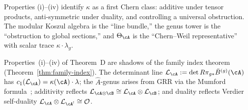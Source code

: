 \begin{remark}
\label{rem:kappa-first-chern}
Properties (i)--(iv) identify $\kappa$ as a first Chern class: additive under tensor products, anti-symmetric under duality, and controlling a universal obstruction.  The modular Koszul algebra is the ``line bundle,'' the genus tower is the ``obstruction to global sections,'' and $\Theta_{\cA}$ is the ``Chern--Weil representative'' with scalar trace $\kappa \cdot \lambda_g$.
\end{remark}

\begin{remark}\label{rem:homotopy-native-d}
Properties~(i)--(iv) of Theorem~D are shadows of the family index
theorem (Theorem~\ref{thm:family-index}).
The determinant line $\mathcal{L}_{\cA} := \det R\pi_{g*}\bar{B}^{(g)}(\cA)$
has $c_1(\mathcal{L}_{\cA}) = \kappa(\cA)\cdot\lambda$;
the $\hat{A}$-genus arises from GRR via the Mumford
formula~\cite{Mumford83}; additivity reflects
$\mathcal{L}_{\cA\otimes\cB}\cong\mathcal{L}_{\cA}\otimes\mathcal{L}_{\cB}$;
and duality reflects Verdier self-duality
$\mathcal{L}_{\cA}\otimes\mathcal{L}_{\cA^!}\cong\mathcal{O}$.
\end{remark}

